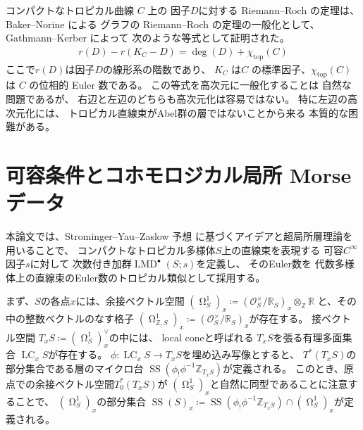 \documentclass[uplatex,dvipdfmx,12pt]{jsarticle}
\numberwithin{equation}{section}
\theoremstyle{definition}
\newcommand{\deq}{\coloneqq}
\newcommand{\opn}[1]{\operatorname{#1}}
\newcommand{\beforesection}{\vspace{-15pt}}
\newcommand{\aftersection}{\vspace{-8pt}}
\DeclareMathOperator{\tform}{\Omega}
\begin{document}
コンパクトなトロピカル曲線 $C$ 上の
因子$D$に対する
Riemann--Roch の定理は、
Baker--Norine による
グラフの Riemann--Roch の定理の一般化として、
Gathmann--Kerber
\cite{gathmannRiemannRochTheoremTropical2008a} によって 
次のような等式として証明された。
\begin{align} \label{equation-tropical-rr}
r(D)-r(K_C-D)=\opn{deg}(D)+\chi_{\mathrm{top}}(C)
\end{align}
ここで$r(D)$は因子$D$の線形系の階数であり、
$K_C$ は$C$ の標準因子、$\chi_{\mathrm{top}}(C)$ は
$C$ の位相的 Euler 数である。
この等式を高次元に一般化することは
自然な問題であるが、
右辺と左辺のどちらも高次元化は容易ではない。
特に左辺の高次元化には、
トロピカル直線束がAbel群の層ではないことから来る
本質的な困難がある。

\beforesection

\section{可容条件とコホモロジカル局所 Morse データ}

\aftersection

本論文では、Strominger--Yau--Zaslow 予想
\cite{stromingerMirrorSymmetryTduality1996}
に基づくアイデアと超局所層理論\cite{MR1299726}を
用いることで、
コンパクトなトロピカル多様体$S$上の直線束を表現する 
可容$C^{\infty}$因子$s$に対して
次数付き加群$\opn{LMD}^{\bullet}(S;s)$を定義し、
そのEuler数を
代数多様体上の直線束のEuler数のトロピカル類似として採用する。

まず、$S$の各点$x$には、余接ベクトル空間
$(\tform^{1}_{S})_x\deq
(\mathcal{O}_S^{\times}/\mathbb{R}_S)_x
\otimes_{\mathbb{Z}}\mathbb{R}$
と、その中の整数ベクトルのなす格子
$(\tform^{1}_{\mathbb{Z},S})_x\deq
(\mathcal{O}_S^{\times}/\mathbb{R}_S)_x$が存在する。
接ベクトル空間
$T_x S\deq(\tform^{1}_{S})_x^{\vee}$の中には、
local coneと呼ばれる
$T_xS$を張る有理多面集合
$\opn{LC}_x S$が存在する。
$\phi \colon \opn{LC}_x S\to T_x S$を埋め込み写像とすると、
$T^{*}(T_xS)$の部分集合である層のマイクロ台
$\opn{SS}(\phi_!\phi^{-1}\mathbb{Z}_{T_xS})$が定義される。
このとき、原点での余接ベクトル空間$T^{*}_0(T_xS)$が
$(\tform_S^{1})_x$と自然に同型であることに注意することで、
$(\tform_S^{1})_x$の部分集合
$\opn{SS}(S)_x\deq \opn{SS}(\phi_!\phi^{-1}\mathbb{Z}_{T_xS})
\cap (\tform_S^{1})_x$が定義される。
\end{document}
